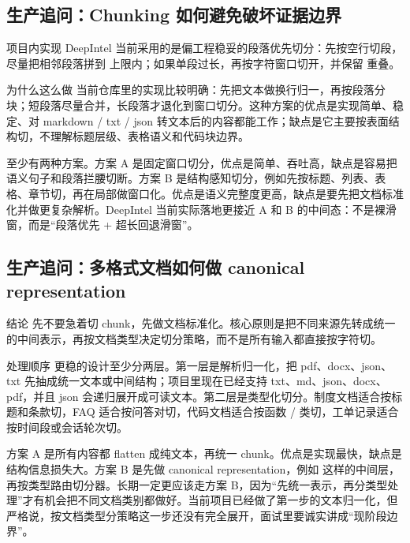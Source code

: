 \documentclass[12pt]{article}
\begin{document}
\subsection{生产追问：Chunking 如何避免破坏证据边界}
\begin{qaBox}{项目内实现}
DeepIntel 当前采用的是偏工程稳妥的段落优先切分：先按空行切段，尽量把相邻段落拼到  上限内；如果单段过长，再按字符窗口切开，并保留  重叠。
\end{qaBox}

\begin{analysisBox}{为什么这么做}
当前仓库里的实现比较明确：先把文本做换行归一，再按段落分块；短段落尽量合并，长段落才退化到窗口切分。这种方案的优点是实现简单、稳定、对 markdown / txt / json 转文本后的内容都能工作；缺点是它主要按表面结构切，不理解标题层级、表格语义和代码块边界。

至少有两种方案。方案 A 是固定窗口切分，优点是简单、吞吐高，缺点是容易把语义句子和段落拦腰切断。方案 B 是结构感知切分，例如先按标题、列表、表格、章节切，再在局部做窗口化。优点是语义完整度更高，缺点是要先把文档标准化并做更复杂解析。DeepIntel 当前实际落地更接近 A 和 B 的中间态：不是裸滑窗，而是“段落优先 + 超长回退滑窗”。
\end{analysisBox}

\subsection{生产追问：多格式文档如何做 canonical representation}
\begin{qaBox}{结论}
先不要急着切 chunk，先做文档标准化。核心原则是把不同来源先转成统一的中间表示，再按文档类型决定切分策略，而不是所有输入都直接按字符切。
\end{qaBox}

\begin{analysisBox}{处理顺序}
更稳的设计至少分两层。第一层是解析归一化，把 pdf、docx、json、txt 先抽成统一文本或中间结构；项目里现在已经支持 txt、md、json、docx、pdf，并且 json 会递归展开成可读文本。第二层是类型化切分。制度文档适合按标题和条款切，FAQ 适合按问答对切，代码文档适合按函数 / 类切，工单记录适合按时间段或会话轮次切。

方案 A 是所有内容都 flatten 成纯文本，再统一 chunk。优点是实现最快，缺点是结构信息损失大。方案 B 是先做 canonical representation，例如  这样的中间层，再按类型路由切分器。长期一定更应该走方案 B，因为“先统一表示，再分类型处理”才有机会把不同文档类别都做好。当前项目已经做了第一步的文本归一化，但严格说，按文档类型分策略这一步还没有完全展开，面试里要诚实讲成“现阶段边界”。
\end{analysisBox}
\end{document}
